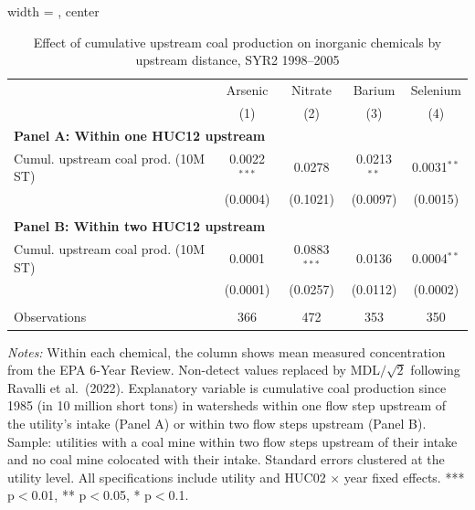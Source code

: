 \begin{table}[htbp]
   
   \caption{\label{tab:6yr_huc02fe_inorg_ravalli_2005_k2} Effect of cumulative upstream coal production on inorganic chemicals by upstream distance, SYR2 1998--2005}
   \bigskip
   
   \centering
   
\begin{adjustbox}{width = \textwidth, center}
   \begin{tabular}{lcccc}
      \toprule
       & Arsenic & Nitrate & Barium & Selenium \\
                                          & (1)            & (2)      & (3)           & (4)\\  
      \midrule 
      \multicolumn{5}{l}{\textbf{Panel A: Within one HUC12 upstream}} \\
      Cumul. upstream coal prod. (10M ST) & 0.0022$^{***}$ & 0.0278   & 0.0213$^{**}$ & 0.0031$^{**}$\\   
                                          & (0.0004)       & (0.1021) & (0.0097)      & (0.0015)\\   
       \\
      \midrule 
      \multicolumn{5}{l}{\textbf{Panel B: Within two HUC12 upstream}} \\
      Cumul. upstream coal prod. (10M ST) & 0.0001   & 0.0883$^{***}$ & 0.0136   & 0.0004$^{**}$\\   
                                          & (0.0001) & (0.0257)       & (0.0112) & (0.0002)\\   
       \\
      Observations                        & 366      & 472            & 353      & 350\\  
      \bottomrule
   \end{tabular}
\end{adjustbox}
   
   {\tiny\linespread{1}\selectfont \par \raggedright 
   \textit{Notes:} Within each chemical, the column shows mean measured concentration from the EPA 6-Year Review. Non-detect values replaced by MDL$/\sqrt{2}$ following Ravalli et al.~(2022). Explanatory variable is cumulative coal production since 1985 (in 10 million short tons) in watersheds within one flow step upstream of the utility's intake (Panel A) or within two flow steps upstream (Panel B). Sample: utilities with a coal mine within two flow steps upstream of their intake and no coal mine colocated with their intake. Standard errors clustered at the utility level. All specifications include utility and HUC02 $\times$ year fixed effects. *** p$<$0.01, ** p$<$0.05, * p$<$0.1.}
   
\end{table}


